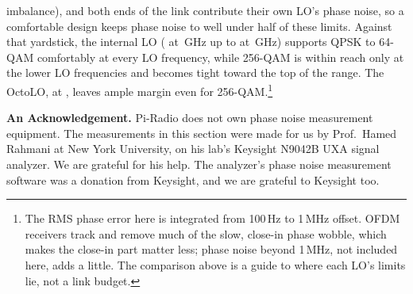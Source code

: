 imbalance), and both ends of the link contribute their own LO's phase noise, so a comfortable design keeps phase
noise to well under half of these limits. Against that yardstick, the internal LO (\pnRmsLow\textdegree{} at
\pnLoLow\,GHz up to \pnRmsHigh\textdegree{} at \pnLoHigh\,GHz) supports QPSK to 64-QAM comfortably at every LO
frequency, while 256-QAM is within reach only at the lower LO frequencies and becomes tight toward the top of the
range. The OctoLO, at \pnOctoRms\textdegree{}, leaves ample margin even for 256-QAM.\footnote{The RMS phase error
here is integrated from 100\,Hz to 1\,MHz offset. OFDM receivers track and remove much of the slow, close-in phase
wobble, which makes the close-in part matter less; phase noise beyond 1\,MHz, not included here, adds a little.
The comparison above is a guide to where each LO's limits lie, not a link budget.}

\textbf{An Acknowledgement.} Pi-Radio does not own phase noise measurement equipment. The measurements in this
section were made for us by Prof.\ Hamed Rahmani at New York University, on his lab's Keysight N9042B UXA signal
analyzer. We are grateful for his help. The analyzer's phase noise measurement software was a donation from
Keysight, and we are grateful to Keysight too.

\clearpage
\flushbottom
